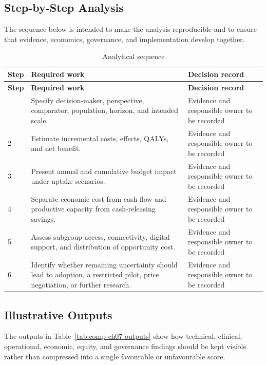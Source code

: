 \subsection{Step-by-Step Analysis}
The sequence below is intended to make the analysis reproducible and to ensure
that evidence, economics, governance, and implementation develop together.

\begin{longtable}{@{}p{}p{}p{}@{}}
\caption{Analytical sequence}
\label{tab:comp-ch07-analysis-steps}\\
\toprule
\textbf{Step} & \textbf{Required work} & \textbf{Decision record} \\
\midrule
\endfirsthead
\toprule
\textbf{Step} & \textbf{Required work} & \textbf{Decision record} \\
\midrule
\endhead
\bottomrule
\endlastfoot
1 & Specify decision-maker, perspective, comparator, population, horizon, and intended scale. & Evidence and responsible owner to be recorded \\
2 & Estimate incremental costs, effects, QALYs, and net benefit. & Evidence and responsible owner to be recorded \\
3 & Present annual and cumulative budget impact under uptake scenarios. & Evidence and responsible owner to be recorded \\
4 & Separate economic cost from cash flow and productive capacity from cash-releasing savings. & Evidence and responsible owner to be recorded \\
5 & Assess subgroup access, connectivity, digital support, and distribution of opportunity cost. & Evidence and responsible owner to be recorded \\
6 & Identify whether remaining uncertainty should lead to adoption, a restricted pilot, price negotiation, or further research. & Evidence and responsible owner to be recorded \\
\end{longtable}

\subsection{Illustrative Outputs}
The outputs in Table~\ref{tab:comp-ch07-outputs} show how technical,
clinical, operational, economic, equity, and governance findings should be kept
visible rather than compressed into a single favourable or unfavourable score.

